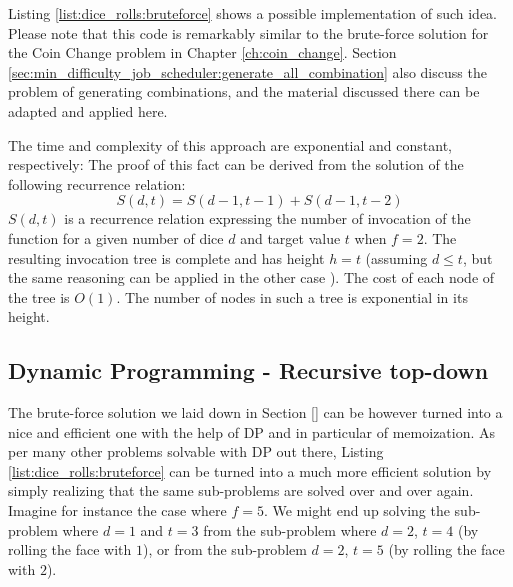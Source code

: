 Listing \ref{list:dice_rolls:bruteforce} shows a possible implementation of such idea. Please note
that this code is remarkably similar to the brute-force solution for the Coin Change problem in
Chapter \ref{ch:coin_change}. Section
\ref{sec:min_difficulty_job_scheduler:generate_all_combination} also discuss the problem of
generating combinations, and the material discussed there can be adapted and applied here.


The time and  complexity of this approach are exponential and constant, respectively: The proof of
this fact can be derived from the solution of the following recurrence relation:
\begin{equation}
	S(d,t) = S(d-1,t-1) + S(d-1,t-2)
\label{eq:dice_rolls:dpformula}
\end{equation}
$S(d,t)$ is a recurrence relation expressing the number of invocation of the function 
for a given number of dice $d$ and target value $t$ when $f=2$. The resulting invocation tree is
complete and has height $h=t$ (assuming $d \leq t$, but the same reasoning can be applied in the
other case ). The cost of each node of the tree is $O(1)$. The number of nodes in such a tree is
exponential in its height. 

\subsection{Dynamic Programming - Recursive top-down}
\label{dice_rolls:sec:DP}
The brute-force solution we laid down in Section \ref{} can be however turned into a nice and
efficient one with the help of DP and in particular of memoization. As per many other problems
solvable with DP out there, Listing \ref{list:dice_rolls:bruteforce} can be turned into a much more
efficient solution by simply realizing that the same sub-problems are solved over and over again.
Imagine for instance the case where $f=5$. We might end up solving the sub-problem where $d=1$ and
$t=3$  from the sub-problem where $d=2$, $t=4$ (by rolling the face with $1$), or from the
sub-problem $d=2$, $t=5$ (by rolling the face with $2$).

